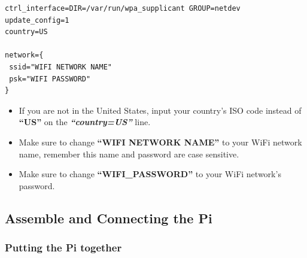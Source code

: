 \documentclass{article}
\begin{document}
\begin{enumerate}
\begin{lstlisting}
ctrl_interface=DIR=/var/run/wpa_supplicant GROUP=netdev
update_config=1
country=US

network={
 ssid="WIFI NETWORK NAME"
 psk="WIFI PASSWORD"
}
\end{lstlisting}

  \begin{itemize}
  \item If you are not in the United States, input your country's ISO code instead of \textbf{``US''} on the \textbf{\textit{``country=US''}} line.
  \item Make sure to change \textbf{``WIFI NETWORK NAME''} to your WiFi network name, remember this name and password are case sensitive.
  \item Make sure to change \textbf{``WIFI\_PASSWORD''} to your WiFi network's password.
  \end{itemize}
  
\end{enumerate}

\subsection{Assemble and Connecting the Pi}

\subsubsection{Putting the Pi together}
\end{document}
